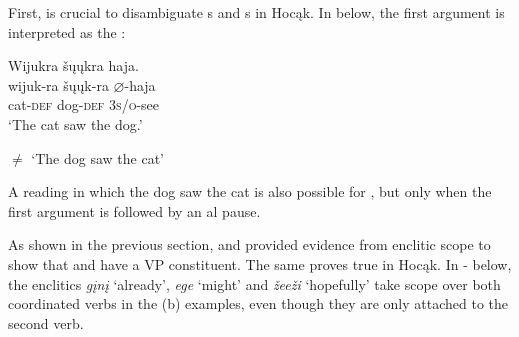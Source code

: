\documentclass[output=paper]{LSP/langsci}
\begin{document}
First,  is crucial to disambiguate s and s in Hocąk.  In  below, the first argument is interpreted as the :
 

\begin{exe}
\ex\label{ex:jrs:31} 
\glll Wijukra	\v{s}\k{u}\k{u}kra 		haja.\\
wijuk-ra 		\v{s}\k{u}\k{u}k-ra 		$\varnothing$-haja \\
cat-\textsc{def} 		dog-\textsc{def} 	\textsc{3s/o}-see \\
\trans `The cat saw the dog.'

$\neq$ `The dog saw the cat'
\end{exe}

A reading in which the dog saw the cat is also possible for , but only when the first argument is followed by an al pause.
	
 
As shown in the previous section, \citet{Boyle2007} and \citet{West2003} provided evidence from enclitic scope to show that  and  have a VP constituent.  The same proves true in Hocąk.  In - below, the enclitics \textit{g\k{i}n\k{i}} `already', \textit{ege} `might' and \textit{\v{z}ee\v{z}i} `hopefully' take scope over both coordinated verbs in the (b) examples, even though they are only attached to the second verb.
 
\end{document}
